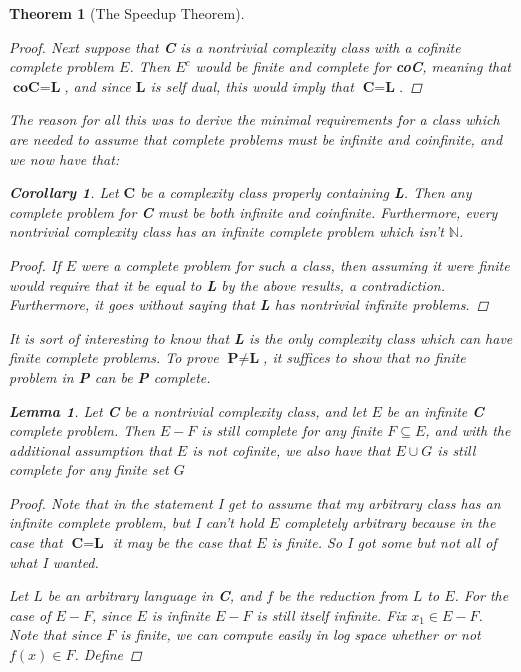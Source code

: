 \documentclass{article}
\theoremstyle{definition}
\theoremstyle{plain}
\theoremstyle{theorem}
\newtheorem{lemma}{Lemma}[section]
\newtheorem{theorem}{Theorem}[section]
\newtheorem{corollary}{Corollary}[section]
\begin{document}
\begin{theorem}[The Speedup Theorem]
\begin{proof}
	\par Next suppose that \textbf{C} is a nontrivial complexity class with a cofinite complete problem $E$. Then $E^c$ would be finite and complete for \textbf{coC}, meaning that $\textbf{coC} = \textbf{L}$, and since $\textbf{L}$ is self dual, this would imply that $\textbf{C} = \textbf{L}$.
\end{proof}
The reason for all this was to derive the minimal requirements for a class which are needed to assume that complete problems must be infinite and coinfinite, and we now have that:
\begin{corollary}
	Let $\textbf{C}$ be a complexity class properly containing \textbf{L}. Then any complete problem for \textbf{C} must be both infinite and coinfinite. Furthermore, every nontrivial complexity class has an infinite complete problem which isn't $\mathbb{N}$.
\end{corollary}
\begin{proof}
	If $E$ were a complete problem for such a class, then assuming it were finite would require that it be equal to \textbf{L} by the above results, a contradiction. Furthermore, it goes without saying that \textbf{L} has nontrivial infinite problems.
\end{proof}
It is sort of interesting to know that \textbf{L} is the only complexity class which can have finite complete problems. To prove $\textbf{P} \neq \textbf{L}$, it suffices to show that no finite problem in \textbf{P} can be \textbf{P} complete.
\begin{lemma}
	Let \textbf{C} be a nontrivial complexity class, and let $E$ be an infinite \textbf{C} complete problem. Then $E-F$ is still complete for any finite $F \subseteq E$, and with the additional assumption that $E$ is not cofinite, we also have that $E \cup G$ is still complete for any finite set $G$
\end{lemma}
\begin{proof}
	Note that in the statement I get to assume that my arbitrary class has an infinite complete problem, but I can't hold $E$ completely arbitrary because in the case that $\textbf{C} = \textbf{L}$ it may be the case that $E$ is finite. So I got some but not all of what I wanted.
	\par Let $L$ be an arbitrary language in \textbf{C}, and $f$ be the reduction from $L$ to $E$. For the case of $E-F$, since $E$ is infinite $E-F$ is still itself infinite. Fix $x_1 \in E-F$. Note that since $F$ is finite, we can compute easily in log space whether or not $f(x) \in F$. Define

\end{proof}
\end{theorem}
\end{document}
